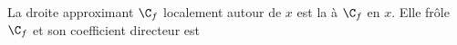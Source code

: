 %	
%
%


%

\begin{definition*}
	La droite approximant $\C_f$ localement autour de $x$ est la  à $\C_f$ en $x$.
	Elle frôle $\C_f$ et son coefficient directeur est 
\end{definition*}

